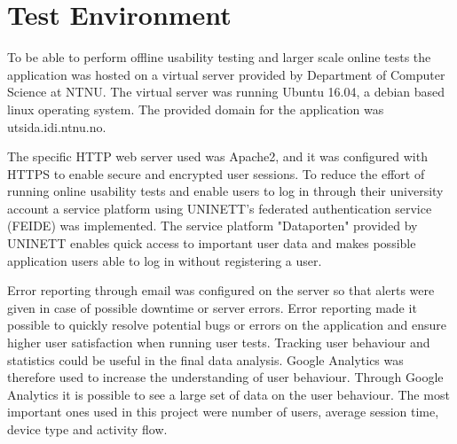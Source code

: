 \section{Test Environment}
To be able to perform offline usability testing and larger scale online tests the application was hosted on a virtual server provided by Department of Computer Science at NTNU. The virtual server was running Ubuntu 16.04, a debian based linux operating system. The provided domain for the application was utsida.idi.ntnu.no.

The specific HTTP web server used was Apache2, and it was configured with HTTPS to enable secure and encrypted user sessions. To reduce the effort of running online usability tests and enable users to log in through their university account a service platform using UNINETT's federated authentication service (FEIDE) was implemented. The service platform "Dataporten"\cite{dataporten} provided by UNINETT enables quick access to important user data and makes possible application users able to log in without registering a user. 

Error reporting through email was configured on the server so that alerts were given in case of possible downtime or server errors. Error reporting made it possible to quickly resolve potential bugs or errors on the application and ensure higher user satisfaction when running user tests. Tracking user behaviour and statistics could be useful in the final data analysis. Google Analytics was therefore used to increase the understanding of user behaviour. Through Google Analytics it is possible to see a large set of data on the user behaviour. The most important ones used in this project were number of users, average session time, device type and activity flow.  

\cleardoublepage